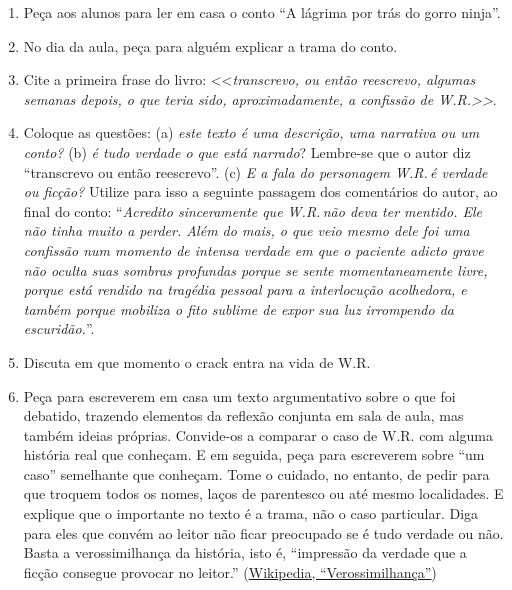 \documentclass[12pt]{extarticle}
\begin{document}
   \begin{enumerate}
   	\item Peça aos alunos para ler em casa o conto ``A lágrima por trás do gorro ninja''. 
   	\item No dia da aula, peça para alguém explicar a trama do conto. 

   	\item Cite a primeira frase do livro: <<\emph{transcrevo, ou então reescrevo, algumas semanas depois, o que teria sido, aproximadamente, a confissão de {W.R}.>>}. 

   	\item Coloque as questões: 
   	(a) \textit{este texto é uma descrição, uma narrativa ou um conto?}
   	(b) \textit{é tudo verdade o que está narrado}? Lembre-se que o autor diz  
   	``transcrevo ou então reescrevo''. 
   	(c) \textit{E a fala do personagem W.R.\,é verdade ou ficção?} Utilize para isso a 
   	seguinte passagem dos comentários do autor, ao final do conto:
   	``\emph{Acredito sinceramente que {W.R.}\,não deva ter mentido. Ele não tinha
	muito a perder. Além do mais, o que veio mesmo dele foi uma confissão
	num momento de intensa verdade em que o paciente adicto grave não oculta
	suas sombras profundas porque se sente momentaneamente livre, porque
	está rendido na tragédia pessoal para a interlocução acolhedora, e
	também porque mobiliza o fito sublime de expor sua luz irrompendo da
	escuridão.}''.
 
   	\item Discuta em que momento o crack entra na vida de W.R. 
	\item 
	Peça para escreverem em casa um texto argumentativo sobre o que foi 
	debatido, trazendo elementos da reflexão conjunta em sala de aula, mas também ideias próprias.
	Convide-os a comparar o caso de W.R. com alguma história real que conheçam. 
	E em seguida, peça para escreverem sobre ``um caso'' semelhante que conheçam.
	Tome o cuidado, no entanto, de pedir para que troquem todos os nomes, laços de
	parentesco ou até mesmo localidades. E explique que o importante no texto 
	é a trama, não o caso particular. Diga para eles que convém 
	ao leitor não ficar preocupado se é tudo verdade ou não. Basta a 
	verossimilhança da história, isto é, ``impressão da verdade que a ficção 
	consegue provocar no leitor.'' (\href{https://pt.wikipedia.org/wiki/Verossimilhan%C3%A7a#:~:text=Verossimilhan%C3%A7a%20%C3%A9%20a%20impress%C3%A3o%20da,que%20acontecem%20na%20realidade%20vivida.}{Wikipedia, ``Verossimilhança''})
   \end{enumerate}
\end{document}

